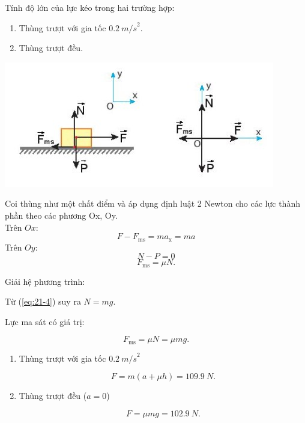 \begin{enumerate}[label=\bfseries Bài \arabic*:,leftmargin=1.5cm]
{	Tính độ lớn của lực kéo trong hai trường hợp:
	\begin{enumerate}[label=\alph*)]
		\item  Thùng trượt với gia tốc $\SI{0,2}{m/s}^2$.
		\item Thùng trượt đều.
	\end{enumerate}
}

\hideall
{
	\begin{center}
		\includegraphics[scale=1]{../figs/VN10-2022-PH-TP021-1.jpg}
	\end{center}
	
	Coi thùng như một chất điểm và áp dụng định luật 2 Newton cho các lực thành phần theo các phương Ox, Oy.\\
	Trên $Ox$:
	\begin{equation}
		\label{eq:21-3}
		F - F_\text{ms} = ma_\text{x} = ma
	\end{equation}
	Trên $Oy$:
	\begin{equation}
		\label{eq:21-4}
		N - P =0
	\end{equation}
	$$F_\text{ms} = \mu N.$$
	
	Giải hệ phương trình:
	
	Từ (\ref{eq:21-4}) suy ra $N = mg$.
	
	Lực ma sát có giá trị:
	
	$$F_\text{ms} = \mu N = \mu mg.$$
	
	\begin{enumerate}[label=\alph*)]
		\item  Thùng trượt với gia tốc $\SI{0,2}{m/s}^2$
		
		$$F = m(a + \mu h) = \SI{109,9}{N}.$$
		\item Thùng trượt đều ($a =0$)
		
		$$F = \mu mg = \SI{102,9}{N}.$$
		
	\end{enumerate}
	
	
}
\end{enumerate}
